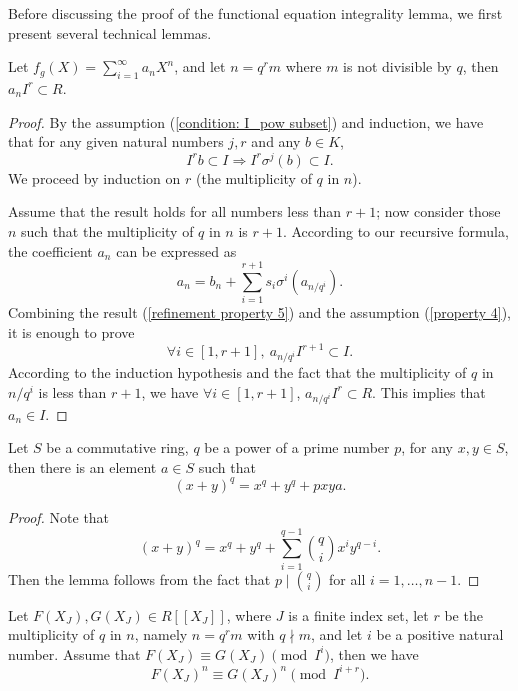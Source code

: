 Before discussing the proof of the functional equation integrality lemma, we first present several
technical lemmas.

\begin{lemma}
    Let $f _g(X) = \sum_{i = 1} ^ \infty a _n X ^ n$, and let $n = q ^ r m$ where $m$ is
    not divisible by $q$, then $a _n I^r \subset R$.
    \label{lemma : tech_lemma_one}
\end{lemma}
\begin{proof}
    By the assumption (\ref{condition: I_pow subset}) and induction,
    we have that for any given natural numbers $j, r$ and any $b \in K$,
    \begin{equation}
        I ^ r b \subset I \Rightarrow I ^ r \sigma ^ j (b) \subset I.
        \label{refinement property 5}
    \end{equation}
    \indent We proceed by induction on $r$ (the multiplicity of $q$ in $n$). \par
    Assume that the result holds for all numbers less than $r + 1$; now consider those $n$
    such that the multiplicity of $q$ in $n$ is $r + 1$.
    According to our recursive formula, the coefficient $a_n$ can be expressed as
    \[a _n = b_n + \sum_ {i = 1} ^ {r + 1} s_i \sigma^i (a _ {n / q ^ i}).\] Combining
    the result (\ref{refinement property 5}) and the assumption (\ref{property 4}), it is enough to
    prove
    \[\forall i \in [1, r + 1], \ a_{n / q ^i} I ^ {r + 1} \subset I.\]
    According to the induction hypothesis and the fact that the multiplicity of $q$
    in ${n/ q^i}$ is less than $r + 1$,
    we have $\forall i \in [1, r + 1]$, $a_{n / q ^i} I ^ {r} \subset R$. This implies that
    $a_n \in I$.
\end{proof}

\begin{lemma}
    Let $S$ be a commutative ring, $q$ be a power of a prime number $p$, for any $x,y \in S$,
    then there is an element $a \in S$ such that
    \[ (x + y) ^ q = x ^ q + y ^ q + p x y a. \]
    \label{lem: exp_prime_pow}
\end{lemma}

\begin{proof}
    Note that
    \[(x + y) ^ q = x ^ q + y ^ q + \sum_{i=1}^{q-1} \binom{q}{i} x ^ i y ^ {q-i}.  \]
    Then the lemma follows from the fact that $p \mid \binom{q}{i}$ for all $i = 1, \ldots, n-1$.
\end{proof}


\begin{lemma}
    Let $F(X_J), G(X_J) \in R[\![X_J]\!]$, where $J$ is a finite index set, let $r$ be the
    multiplicity of $q$ in $n$, namely $n = q ^ r m$ with $q \nmid m$, and let $i$ be a positive
    natural number. Assume that $F(X_J) \equiv G(X_J) \pmod{I^i}$, then we have
    \begin{equation*}
        F(X_J)^n \equiv G(X_J)^n \pmod{I ^{i + r}}.
    \end{equation*}
    \label{lemma: tech_lem pow_congruence}
\end{lemma}

